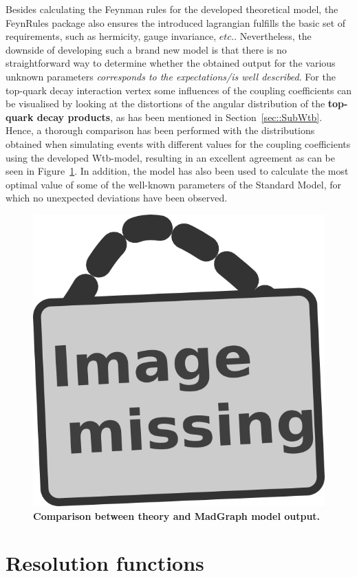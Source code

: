 Besides calculating the Feynman rules for the developed theoretical model, the FeynRules package also ensures the introduced lagrangian fulfills the basic set of requirements, such as hermicity, gauge invariance, $etc. $.
Nevertheless, the downside of developing such a brand new model is that there is no straightforward way to determine whether the obtained output for the various unknown parameters \textit{corresponds to the expectations/is well described}.
For the top-quark decay interaction vertex some influences of the coupling coefficients can be visualised by looking at the distortions of the angular distribution of the \textbf{top-quark decay products}, as has been mentioned in Section~\ref{sec::SubWtb}. 
Hence, a thorough comparison has been performed with the distributions obtained when simulating events with different values for the coupling coefficients using the developed Wtb-model, resulting in an excellent agreement as can be seen in Figure~\ref{fig::ModelTest}.
In addition, the model has also been used to calculate the most optimal value of some of the well-known parameters of the Standard Model, for which no unexpected deviations have been observed. 

\begin{figure}[h!t]
 \centering
 \includegraphics[width = 0.3 \textwidth]{image.png}
 \caption{\textbf{Comparison between theory and MadGraph model output.}} \label{fig::ModelTest}
\end{figure}


\section{Resolution functions} \label{sec::TF}

